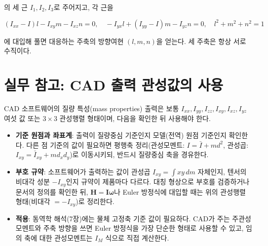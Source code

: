             의 세 근 $I_1, I_2, I_3$로 주어지고, 각 근을
            
            \begin{equation}
                (I_{xx} - I)l - I_{xy}m - I_{xz}n = 0, \quad
                -I_{yx}l + (I_{yy} - I)m - I_{yz}n = 0, \quad
                l^2 + m^2 + n^2 = 1
            \end{equation}
    
            에 대입해 풀면 대응하는 주축의 방향여현 $(l, m, n)$을 얻는다. 세 주축은 항상 서로 수직이다.

    \section*{실무 참고: CAD 출력 관성값의 사용}
        CAD 소프트웨어의 질량 특성(mass properties) 출력은 보통 $I_{xx}, I_{yy}, I_{zz}, I_{xy}, I_{xz}, I_{yz}$ 여섯 값 또는 $3\times3$ 관성행렬 형태이며, 다음을 확인한 뒤 사용해야 한다.
  
        \begin{itemize}
            \item \textbf{기준 원점과 좌표계}: 출력이 질량중심 기준인지 모델(전역) 원점 기준인지 확인한다. 다른 점 기준의 값이 필요하면 평행축 정리(관성모멘트: $I = \bar I + md^2$, 관성곱: $I_{xy} = \bar I_{xy} + m d_x d_y$)로 이동시키되, 반드시 질량중심 축을 경유한다.
            \item \textbf{부호 규약}: 소프트웨어가 출력하는 값이 관성곱 $I_{xy} = \int xy\,dm$ 자체인지, 텐서의 비대각 성분 $-I_{xy}$인지 규약이 제품마다 다르다. 대칭 형상으로 부호를 검증하거나 문서의 정의를 확인한 뒤, $\mathbf{H} = \mathbf{I}\boldsymbol{\omega}$나 Euler 방정식에 대입할 때는 위의 관성행렬 형태(비대각 $= -I_{xy}$)로 정리한다.
            \item \textbf{적용}: 동역학 해석(7장)에는 물체 고정축 기준 값이 필요하다. CAD가 주는 주관성모멘트와 주축 방향을 쓰면 Euler 방정식을 가장 단순한 형태로 사용할 수 있고, 임의 축에 대한 관성모멘트는 $I_M$ 식으로 직접 계산한다.
        \end{itemize}